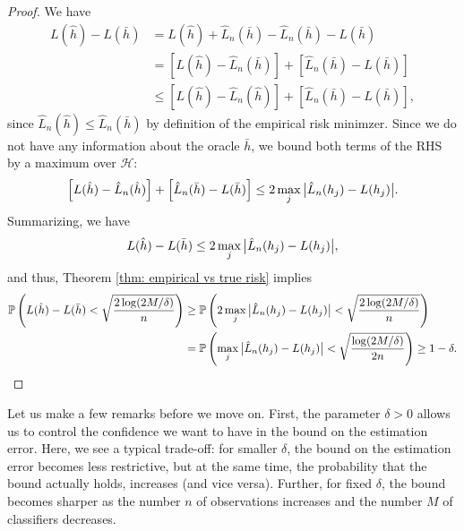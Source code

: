\begin{proof}
We have
\begin{align*}
    L(\hat h) - L(\bar h) &= L(\hat h) + \hat L_n(\bar h) - \hat L_n(\bar h) - L(\bar h) \\
        &= \left[L(\hat h) - \hat L_n(\bar h)\right] + \left[\hat L_n(\bar h) - L(\bar h)\right] \\
        &\leq \left[L(\hat h) - \hat L_n(\hat h)\right] + \left[\hat L_n(\bar h) - L(\bar h)\right],
\end{align*}
since $\hat L_n(\hat h) \leq \hat L_n(\bar h)$ by definition of the empirical risk minimzer. Since we do not have any information about the oracle $\bar h$, we bound both terms of the RHS by a maximum over $\mathcal{H}$:
\[
    \left[L(\hat h) - \hat L_n(\hat h)\right] + \left[\hat L_n(\bar h) - L(\bar h)\right] \leq 2 \max_j \big\lvert \hat L_n(h_j) - L(h_j) \big\rvert.
\]
Summarizing, we have
\[
    L(\hat h) - L(\bar h) \leq 2 \max_j \big\lvert \hat L_n(h_j) - L(h_j) \big\rvert,
\]
and thus, Theorem \ref{thm: empirical vs true risk} implies
\begin{align*}
    \mathbb{P}\left(L(\hat h) - L(\bar h) < \sqrt{\frac{2\log(2M/\delta)}{n}}\right) &\geq \mathbb{P}\left(2 \max_j \big\lvert \hat L_n(h_j) - L(h_j) \big\rvert < \sqrt{\frac{2\log(2M/\delta)}{n}}\right) \\
        &= \mathbb{P}\left(\max_j \big\lvert \hat L_n(h_j) - L(h_j) \big\rvert < \sqrt{\frac{\log(2M/\delta)}{2n}}\right) \geq 1 - \delta.
\end{align*}
\end{proof}

Let us make a few remarks before we move on. First, the parameter $\delta > 0$ allows us to control the confidence we want to have in the bound on the estimation error. Here, we see a typical trade-off: for smaller $\delta$, the bound on the estimation error becomes less restrictive, but at the same time, the probability that the bound actually holds, increases (and vice versa). Further, for fixed $\delta$, the bound becomes sharper as the number $n$ of observations increases and the number $M$ of classifiers decreases.
